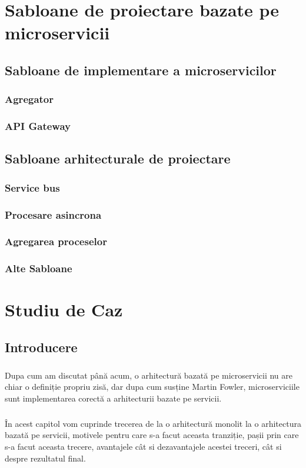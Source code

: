 \documentclass[12pt]{report}
\begin{document}
\chapter{Sabloane de proiectare bazate pe microservicii}
	\section{Sabloane de implementare a microservicilor}
		\subsection{Agregator}
		\subsection{API Gateway}
	\section{Sabloane arhitecturale de proiectare}
		\subsection{Service bus}
		\subsection{Procesare asincrona}
		\subsection{Agregarea proceselor}
		\subsection{Alte Sabloane}
\chapter{Studiu de Caz}
	\section{Introducere}
	\paragraph{}Dupa cum am discutat până acum, o arhitectură bazată pe microservicii nu are chiar o definiție propriu zisă, dar dupa cum susține Martin Fowler, microserviciile sunt implementarea corectă a arhitecturii bazate pe servicii.
	\paragraph{}În acest capitol vom cuprinde trecerea de la o arhitectură monolit la o arhitectura bazată pe servicii, motivele pentru care s-a facut aceasta tranziție, pașii prin care s-a facut aceasta trecere, avantajele cât si dezavantajele acestei treceri, cât si despre rezultatul final.
\end{document}
